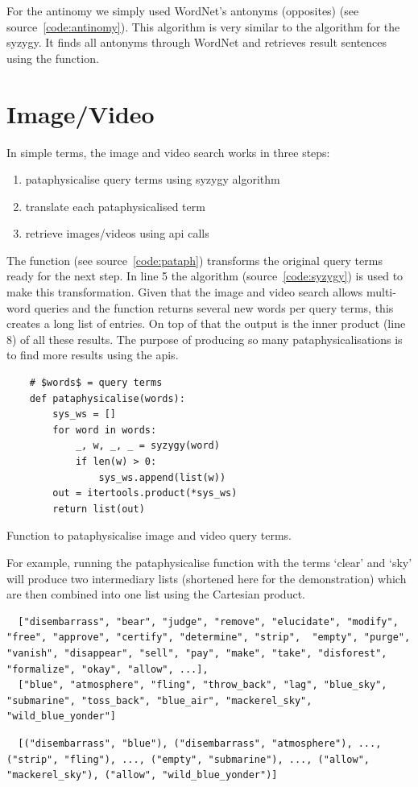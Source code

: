 For the antinomy we simply used WordNet's antonyms (opposites) (see source~\ref{code:antinomy}). This algorithm is very similar to the algorithm for the syzygy. It finds all antonyms through WordNet and retrieves result sentences using the  function.


\section{Image/Video}

In simple terms, the image and video search works in three steps:
\begin{enumerate}
  \item pataphysicalise query terms using syzygy algorithm
  \item translate each pataphysicalised term
  \item retrieve images/videos using \acrshort{api} calls
\end{enumerate}

The  function (see source~\ref{code:pataph}) transforms the original query terms ready for the next step. In line 5 the  algorithm (source~\ref{code:syzygy}) is used to make this transformation. Given that the image and video search allows multi-word queries and the  function returns several new words per query terms, this creates a long list of entries. On top of that the output is the inner product (line 8) of all these results. The purpose of producing so many pataphysicalisations is to find more results using the \glspl{api}.

\begin{listing}
  \begin{verbatim}
    # $words$ = query terms
    def pataphysicalise(words):
        sys_ws = []
        for word in words:
            _, w, _, _ = syzygy(word)
            if len(w) > 0:
                sys_ws.append(list(w))
        out = itertools.product(*sys_ws)
        return list(out)
  \end{verbatim}
\caption{Function to pataphysicalise image and video query terms.}
\label{code:pataph}
\end{listing}

For example, running the pataphysicalise function with the terms `clear' and `sky' will produce two intermediary lists (shortened here for the demonstration) which are then combined into one list using the Cartesian product.

\begin{verbatim}
  ["disembarrass", "bear", "judge", "remove", "elucidate", "modify", "free", "approve", "certify", "determine", "strip",  "empty", "purge", "vanish", "disappear", "sell", "pay", "make", "take", "disforest", "formalize", "okay", "allow", ...],
  ["blue", "atmosphere", "fling", "throw_back", "lag", "blue_sky", "submarine", "toss_back", "blue_air", "mackerel_sky", "wild_blue_yonder"]
\end{verbatim}
\begin{verbatim}
  [("disembarrass", "blue"), ("disembarrass", "atmosphere"), ..., ("strip", "fling"), ..., ("empty", "submarine"), ..., ("allow", "mackerel_sky"), ("allow", "wild_blue_yonder")]
\end{verbatim}

